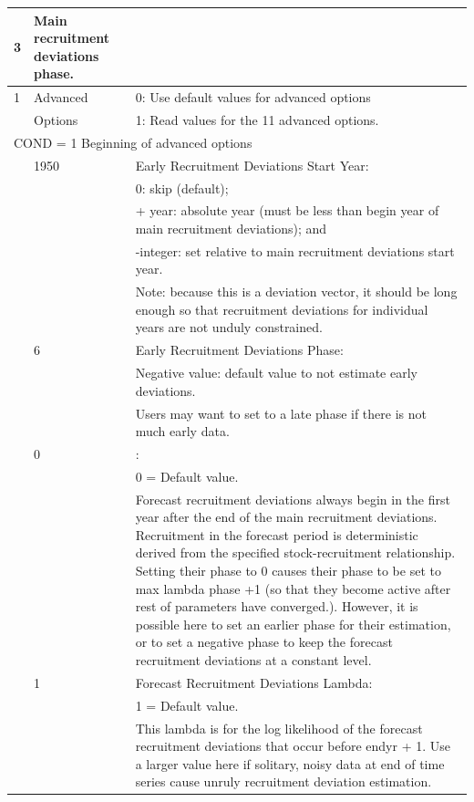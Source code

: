 \begin{longtable}{p{1cm} p{3cm} p{12cm}}
	3 \Tstrut & Main recruitment deviations phase. & \Bstrut\\
	\hline

	1 \Tstrut & Advanced & 0: Use default values for advanced options \\ 
	& Options & 1: Read values for the 11 advanced options. \Bstrut\\
	\hline

	\multicolumn{3}{l}{COND = 1 Beginning of advanced options} \Tstrut\Bstrut\\
	& 1950 & Early Recruitment Deviations Start Year: \\
	& & 0: skip (default); \\
	& & + year: absolute year (must be less than begin year of main recruitment deviations); and \\
	& & -integer: set relative to main recruitment deviations start year. \\
	& & Note: because this is a deviation vector, it should be long enough so that recruitment deviations for individual years are not unduly constrained. \\

	\Tstrut & 6 & Early Recruitment Deviations Phase: \\
	& & Negative value: default value to not estimate early deviations. \\
	& & Users may want to set to a late phase if there is not much early data. \\
	
	\Tstrut & 0 & \raisebox{0.1\ht\strutbox}{\hypertarget{FcastRecDevPhase}{Forecast Recruitment Deviations Phase}}: \\
			&   & 0 = Default value. \\
			&   & Forecast recruitment deviations always begin in the first year after the end of the main recruitment deviations. Recruitment in the forecast period is deterministic derived from the specified stock-recruitment relationship. Setting their phase to 0 causes their phase to be set to max lambda phase +1 (so that they become active after rest of parameters have converged.). However, it is possible here to set an earlier phase for their estimation, or to set a negative phase to keep the forecast recruitment deviations at a constant level. \Bstrut\\

	\Tstrut & 1 & Forecast Recruitment Deviations Lambda: \\
			&   & 1 = Default value. \\
			&   & This lambda is for the log likelihood of the forecast recruitment deviations that occur before endyr + 1. Use a larger value here if solitary, noisy data at end of time series cause unruly recruitment deviation estimation. \\
	

\end{longtable}
